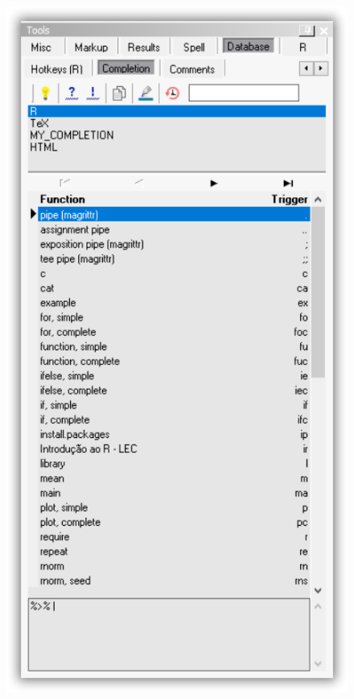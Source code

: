 \begin{figure}[H]
  \includegraphics[scale=0.35]{./res/tools_database_completion.png}~~

\end{figure}
